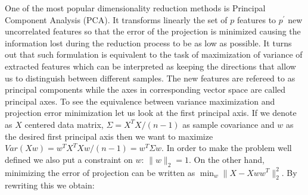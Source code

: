 \documentclass[shortabstract, english, mgr]{iithesis}
\begin{document}
One of the most popular dimensionality reduction methods is Principal Component Analysis (PCA). It transforms linearly the set of $p$ features to $p^{\prime}$ new uncorrelated features so that the error of the projection is minimized causing the information lost during the reduction process to be as low as possible. It turns out that such formulation is equivalent to the task of maximization of variance of extracted features which can be interpreted as keeping the directions that allow us to distinguish between different samples. The new features are refereed to as principal components while the axes in corresponding vector space are called principal axes. To see the equivalence between variance maximization and projection error minimization let us look at the first principal axis. If we denote as $X$ centered data matrix, $\Sigma = X^TX/(n-1)$ as sample covariance and $w$ as the desired first principal axis then we want to maximize $Var(Xw) = w^TX^TXw/(n-1) = w^T\Sigma w$. In order to make the problem well defined we also put a constraint on $w$: $\|w\|_2 = 1$. On the other hand, minimizing the error of projection can be written as $\min_w \| X - X ww^T\|_2^2$. By rewriting this we obtain: 
\end{document}
